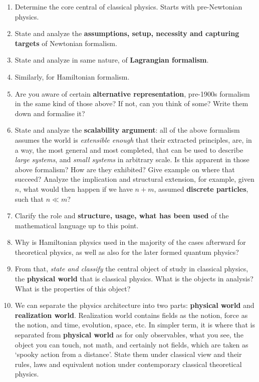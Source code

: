 \documentclass[10pt]{article}
\begin{document}
\begin{enumerate}[itemsep=1pt,topsep=1pt]
  \item Determine the core central of classical physics. Starts with pre-Newtonian physics.
  \item State and analyze the \textbf{assumptions, setup, necessity and capturing targets} of Newtonian formalism. 
  \item State and analyze in same nature, of \textbf{Lagrangian formalism}. 
  \item Similarly, for Hamiltonian formalism. 
  \item Are you aware of certain \textbf{alternative representation}, pre-1900s formalism in the same kind of those above? If not, can you think of some? Write them down and formalise it?
  \item State and analyze the \textbf{scalability argument}: all of the above formalism assumes the world is \textit{extensible enough} that their extracted principles, are, in a way, the most general and most completed, that can be used to describe \textit{large systems}, and \textit{small systems} in arbitrary scale. Is this apparent in those above formalism? How are they exhibited? Give example on where that succeed? Analyze the implication and structural extension, for example, given $n$, what would then happen if we have $n+m$, assumed \textbf{discrete particles}, such that $n\ll m$? 
  \item Clarify the role and \textbf{structure, usage, what has been used} of the mathematical language up to this point. 
  \item Why is Hamiltonian physics used in the majority of the cases afterward for theoretical physics, as well as also for the later formed quantum physics?
  \item From that, \textit{state and classify} the central object of study in classical physics, the \textbf{physical world} that is classical physics. What is the objects in analysis? What is the properties of this object? 
  \item We can separate the physics architecture into two parts: \textbf{physical world} and \textbf{realization world}. Realization world contains fields as the notion, force as the notion, and time, evolution, space, etc. In simpler term, it is where that is separated from \textbf{physical world} as for only observables, what you see, the object you can touch, not math, and certainly not fields, which are taken as `spooky action from a distance'. State them under classical view and their rules, laws and equivalent notion under contemporary classical theoretical physics. 

\end{enumerate}
\end{document}
